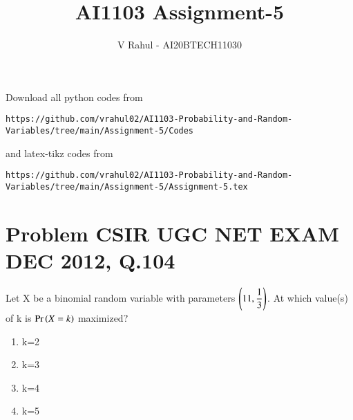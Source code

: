\documentclass[journal,12pt,twocolumn]{IEEEtran}
\begin{document}
\title{AI1103 Assignment-5}
\author{V Rahul - AI20BTECH11030}
\maketitle
\newpage
\bigskip
\renewcommand{\thefigure}{\theenumi}
\renewcommand{\thetable}{\theenumi}
Download all python codes from 
\begin{lstlisting}
https://github.com/vrahul02/AI1103-Probability-and-Random-Variables/tree/main/Assignment-5/Codes
\end{lstlisting}
%
and latex-tikz codes from 
%
\begin{lstlisting}
https://github.com/vrahul02/AI1103-Probability-and-Random-Variables/tree/main/Assignment-5/Assignment-5.tex
\end{lstlisting}
\section*{Problem CSIR UGC NET EXAM DEC 2012, Q.104}
Let X be a binomial random variable with parameters  $\left(11,\displaystyle{\frac{1}{3}}\right)$. At which value(s) of k is $\Pr\left(X = k\right)$ maximized?\\
\begin{enumerate}
\item k=2
\item k=3
\item k=4
\item k=5
\end{enumerate}
\end{document}
